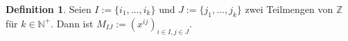 \documentclass{article}
\theoremstyle{definition}
\newtheorem{definition}{Definition}
\begin{document}
\begin{definition}
    Seien $I := \{i_1,\dots, i_k\}$ und $J := \{j_1,\dots, j_k\}$ zwei Teilmengen von $\mathbb{Z}$ für $k \in \mathbb{N}^+$. Dann ist $M_{IJ} := (x^{ij})_{i \in I, j \in J}$. 
\end{definition}


\end{document}
